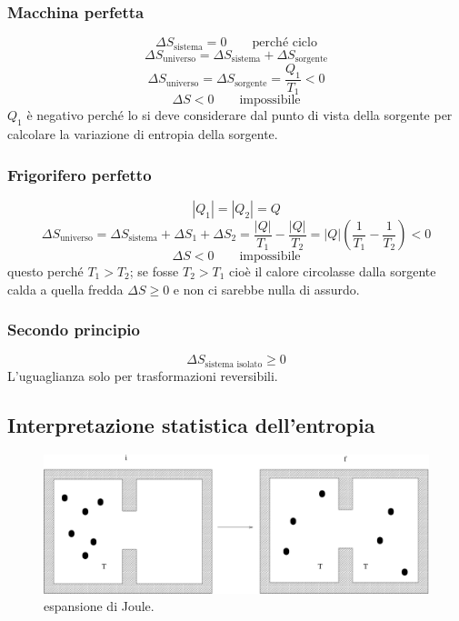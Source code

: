 \subsubsection{Macchina perfetta}

\[\Delta S_\text{sistema}=0 \qquad\text{perché ciclo}\]
\[\Delta S_\text{universo}=\Delta S_\text{sistema}+\Delta S_\text{sorgente}\]
\[\Delta S_\text{universo}=\Delta S_\text{sorgente}=\frac{Q_1}{T_1}<0\]
\[\Delta S<0\qquad \text{impossibile}\]
$Q_1$ è negativo perché lo si deve considerare dal punto di vista della sorgente per calcolare la variazione di entropia della sorgente.

\subsubsection{Frigorifero perfetto}


\[|Q_1|=|Q_2|=Q\]
\[\Delta S_\text{universo}=\Delta S_\text{sistema}+\Delta S_1+\Delta S_2=\frac{|Q|}{T_1}-\frac{|Q|}{T_2}=|Q|\left(\frac{1}{T_1}-\frac{1}{T_2}\right)<0\]
\[\Delta S<0\qquad \text{impossibile}\]
questo perché $T_1>T_2$; se fosse $T_2>T_1$ cioè il calore circolasse dalla sorgente calda a quella fredda $\Delta S\geq 0$ e non ci sarebbe nulla di assurdo.

\subsubsection{Secondo principio}
\[\Delta S_\text{sistema isolato}\geq 0\]
L'uguaglianza solo per trasformazioni reversibili.


\subsection{Interpretazione statistica dell'entropia}
\begin{figure}[htbp]
   \centering
   \includegraphics[scale=0.45]{immagini/fisica1/exp_Joule}
   \caption{espansione di Joule.}
\end{figure}

